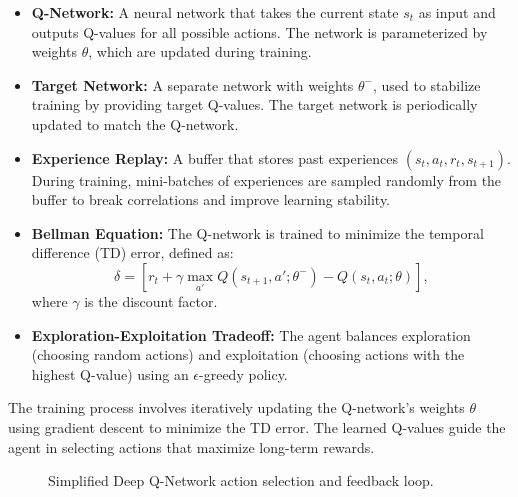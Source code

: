 \documentclass[runningheads]{llncs}
\begin{document}
\begin{itemize}
    \item \textbf{Q-Network:} A neural network that takes the current state $s_t$ as input and outputs Q-values for all possible actions. The network is parameterized by weights $\theta$, which are updated during training.
    \item \textbf{Target Network:} A separate network with weights $\theta^-$, used to stabilize training by providing target Q-values. The target network is periodically updated to match the Q-network.
    \item \textbf{Experience Replay:} A buffer that stores past experiences $(s_t, a_t, r_t, s_{t+1})$. During training, mini-batches of experiences are sampled randomly from the buffer to break correlations and improve learning stability.
    \item \textbf{Bellman Equation:} The Q-network is trained to minimize the temporal difference (TD) error, defined as:
    \[
    \delta = \left[ r_t + \gamma \max_{a'} Q(s_{t+1}, a'; \theta^-) - Q(s_t, a_t; \theta) \right],
    \]
    where $\gamma$ is the discount factor.
    \item \textbf{Exploration-Exploitation Tradeoff:} The agent balances exploration (choosing random actions) and exploitation (choosing actions with the highest Q-value) using an $\epsilon$-greedy policy.
\end{itemize}

The training process involves iteratively updating the Q-network's weights $\theta$ using gradient descent to minimize the TD error. The learned Q-values guide the agent in selecting actions that maximize long-term rewards.


\begin{figure}
    \centering
    \caption{Simplified Deep Q-Network action selection and feedback loop.}
    \label{fig:dqn_loop}
\end{figure}
\end{document}
